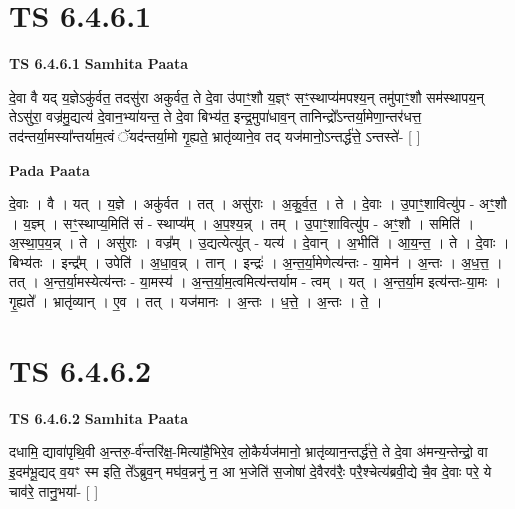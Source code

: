 \documentclass[17pt]{extarticle}
\begin{document}
\section*{ TS 6.4.6.1 }

\textbf{TS 6.4.6.1 } \newline
\textbf{Samhita Paata} \newline

दे॒वा वै यद् य॒ज्ञेऽकु॑र्वत॒ तदसु॑रा अकुर्वत॒ ते दे॒वा उ॑पाꣳ॒॒शौ य॒ज्ञ्ꣳ सꣳ॒॒स्थाप्य॑मपश्य॒न् तमु॑पाꣳ॒॒शौ सम॑स्थापय॒न् तेऽसु॑रा॒ वज्र॑मु॒द्यत्य॑ दे॒वान॒भ्या॑यन्त॒ ते दे॒वा बिभ्य॑त॒ इन्द्र॒मुपा॑धाव॒न् तानिन्द्रो᳚ऽन्तर्या॒मेणा॒न्तर॑धत्त॒ तद॑न्तर्या॒मस्या᳚न्तर्याम॒त्वं ॅयद॑न्तर्या॒मो गृ॒ह्यते॒ भ्रातृ॑व्याने॒व तद् यज॑मानो॒ऽन्तर्द्ध॑त्ते॒ ऽन्तस्ते॑- [  ] \newline

\textbf{Pada Paata} \newline

दे॒वाः । वै । यत् । य॒ज्ञे । अकु॑र्वत । तत् । असु॑राः । अ॒कु॒र्व॒त॒ । ते । दे॒वाः । उ॒पाꣳ॒॒शावित्यु॑प - अꣳ॒॒शौ । य॒ज्ञ्म् । सꣳ॒॒स्थाप्य॒मिति॑ सं - स्थाप्य᳚म् । अ॒प॒श्य॒न्न् । तम् । उ॒पाꣳ॒॒शावित्यु॑प - अꣳ॒॒शौ । समिति॑ । अ॒स्था॒प॒य॒न्न् । ते । असु॑राः । वज्र᳚म् । उ॒द्यत्येत्यु॑त् - यत्य॑ । दे॒वान् । अ॒भीति॑ । आ॒य॒न्त॒ । ते । दे॒वाः । बिभ्य॑तः । इन्द्र᳚म् । उपेति॑ । अ॒धा॒व॒न्न् । तान् । इन्द्रः॑ । अ॒न्त॒र्या॒मेणेत्य॑न्तः - या॒मेन॑ । अ॒न्तः । अ॒ध॒त्त॒ । तत् । अ॒न्त॒र्या॒मस्येत्य॑न्तः - या॒मस्य॑ । अ॒न्त॒र्या॒म॒त्वमित्य॑न्तर्याम - त्वम् । यत् । अ॒न्त॒र्या॒म इत्य॑न्तः-या॒मः । गृ॒ह्यते᳚ । भ्रातृ॑व्यान् । ए॒व । तत् । यज॑मानः । अ॒न्तः । ध॒त्ते॒ । अ॒न्तः । ते॒ ।  \newline




\section*{ TS 6.4.6.2 }

\textbf{TS 6.4.6.2 } \newline
\textbf{Samhita Paata} \newline

दधामि॒ द्यावा॑पृथि॒वी अ॒न्तरु॒-र्व॑न्तरि॑क्ष॒-मित्या॑है॒भिरे॒व लो॒कैर्यज॑मानो॒ भ्रातृ॑व्यान॒न्तर्द्ध॑त्ते॒ ते दे॒वा अ॑मन्य॒न्तेन्द्रो॒ वा इ॒दम॑भू॒द्यद् व॒यꣳ स्म इति॒ ते᳚ऽब्रुव॒न् मघ॑व॒न्ननु॑ न॒ आ भ॒जेति॑ स॒जोषा॑ दे॒वैरव॑रैः॒ परै॒श्चेत्य॑ब्रवी॒द्ये चै॒व दे॒वाः परे॒ ये चाव॑रे॒ तानु॒भया॑- [  ] \newline
\end{document}
